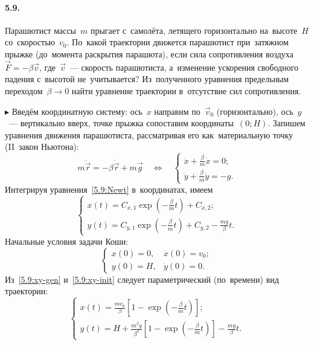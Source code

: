 \documentclass{weekly}
\begin{document}

\paragraph{5.9.} Парашютист массы~$m$ прыгает с~самолёта, летящего
горизонтально на~высоте~$H$ со~скоростью~$v_0$. По~какой траектории
движется парашютист при~затяжном прыжке (до~момента раскрытия
парашюта), если сила сопротивления воздуха~$\vec F = -\beta \vec v$,
где~$\vec v$~--- скорость парашютиста, а~изменение ускорения свободного
падения с~высотой не~учитывается? Из~полученного уравнения
предельным переходом~$\beta \to 0$ найти уравнение траектории
в~отсутствие сил сопротивления.

$\blacktriangleright$ Введём координатную систему:
ось~$x$ направим по~$\vec v_0$ (горизонтально),
ось~$y$~--- вертикально вверх,
точке прыжка сопоставим координаты~$(0; H)$.
Запишем уравнения движения парашютиста,
рассматривая его как~материальную точку (II~закон Ньютона):
\begin{equation}
    m\ddot{\vec r} = -\beta\dot{\vec r} + m\vec g
\quad \Longleftrightarrow \quad
    \begin{cases}
        \ddot x + \frac{\beta}{m}\dot x = 0; \\
        \ddot y + \frac{\beta}{m}\dot y = -g.
    \end{cases}
    \label{5.9:Newt}
\end{equation}
Интегрируя уравнения~\eqref{5.9:Newt} в~координатах, имеем
\begin{equation}
\begin{cases}
    x(t) = C_{x,1} \exp\left( -\frac{\beta}{m} t \right) + C_{x,2}; \\
    y(t) = C_{y,1} \exp\left( -\frac{\beta}{m} t \right) + C_{y,2}
            - \frac{mg}{\beta} t.
    \label{5.9:xy-gen}
\end{cases}
\end{equation}
Начальные условия задачи Коши:
\begin{equation}
\begin{cases}
    x(0) = 0, & \dot x(0) = v_0; \\
    y(0) = H, & \dot y(0) = 0.
    \label{5.9:xy-init}
\end{cases}
\end{equation}
Из~\eqref{5.9:xy-gen} и~\eqref{5.9:xy-init} следует параметрический
(по~времени) вид траектории:
\begin{equation}
\begin{cases}
    x(t) = \frac{mv_0}{\beta}
            \left[ 1 - \exp\left( -\frac{\beta}{m} t \right) \right]; \\
    y(t) = H + \frac{m^2 g}{\beta^2}
            \left[ 1 - \exp\left( -\frac{\beta}{m} t \right) \right] -
            \frac{mg}{\beta} t.
\end{cases}
\end{equation}
\end{document}
